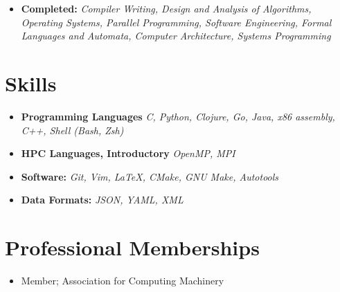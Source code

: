 \documentclass[10pt,letterpaper,sans]{moderncv}
\begin{document}
\begin{itemize}
    \item{
        \textbf{Completed:}
        \textit{
            Compiler Writing, Design and Analysis of Algorithms, Operating
            Systems, Parallel Programming, Software Engineering, Formal
            Languages and Automata, Computer Architecture, Systems Programming
        }
    }
\end{itemize}

\section{Skills}

\vspace{3pt}

\begin{itemize}

    \item{
        \textbf{Programming Languages}
        \textit{
            C, Python, Clojure, Go, Java,  x86 assembly, C++, Shell (Bash, Zsh)
        }
    }
    \vspace{3pt}
    \item{
        \textbf{HPC Languages, Introductory}
        \textit{
            OpenMP, MPI
        }
    }
    \item{
        \textbf{Software:}
        \textit{
            Git, Vim, \LaTeX, CMake, GNU Make, Autotools
        }
    }
    \item {
        \textbf{Data Formats:}
        \textit{
            JSON, YAML, XML
        }
    }
\end{itemize}

\section{Professional Memberships}
\begin{itemize}
    \item {
            Member; Association for Computing Machinery
    }
\end{itemize}
\end{document}
